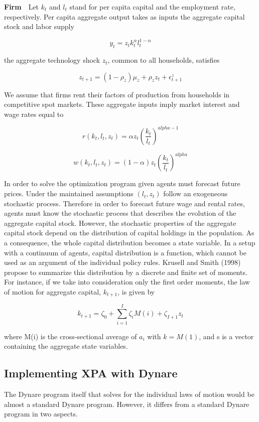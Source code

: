 \documentclass[10pt,math=newtx,citestyle=gb7714-2015,bibstyle=gb7714-2015]{elegantbook}
\begin{document}
{	\textbf{Firm}~~Let $k_t$ and $l_t$ stand for per capita capital and the employment rate, respectively. Per capita aggregate output takes as inputs the aggregate capital stock and labor supply
	
	$$y_t=z_tk_t^{\alpha}l_t^{1-\alpha}$$
	
	the aggregate technology shock $z_t$, common to all households, satisfies
	
	$$z_{t+1}=(1-\rho_z)\mu_z+\rho_zz_t+\epsilon_{t+1}^z$$
	
	We assume that firms rent their factors of production from households in competitive spot markets. These aggregate inputs imply market interest and wage rates equal to
	
	$$r(k_t,l_t,z_t)=\alpha z_t\left(\frac{k_t}{l_t}\right)^{alpha-1}$$
	
	$$w(k_t,l_t,z_t)=(1-\alpha)z_t\left(\frac{k_t}{l_t}\right)^{alpha}$$
	
	In order to solve the optimization program given agents must forecast future prices. Under the maintained assumptions $(l_t, z_t)$ follow an exogeneous stochastic process. Therefore in order to forecast future wage and rental rates, agents must know the stochastic process that describes the evolution of the aggregate capital stock. However, the stochastic properties of the aggregate capital stock depend on the distribution of capital holdings in the population. As a consequence, the whole capital distribution becomes a state variable. In a setup with a continuum of agents, capital distribution is a function, which cannot be used as an argument of the individual policy rules. Krusell and Smith (1998) propose to summarize this
	distribution by a discrete and finite set of moments. For instance, if we take into consideration only the first order moments, the law of motion for aggregate capital, $k_{t+1}$, is given by
	
	$$k_{t+1}=\zeta_0+\sum_{i=1}^{I}\zeta_iM(i)+\zeta_{I+1}z_t$$
	
	where M(i) is the cross-sectional average of $a_i$ with $k = M(1)$, and s is a vector containing the aggregate state variables.
	
	
	
	
	\subsection{Implementing XPA with Dynare}
	
	The Dynare program itself that solves for the individual laws of motion would be almost a standard Dynare program. However, it differs from a standard Dynare program in two aspects.
	
}
\end{document}
